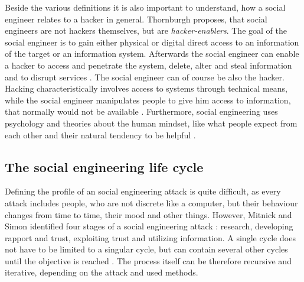 Beside the various definitions it is also important to understand, how a social
engineer relates to a hacker in general. Thornburgh \cite{thornburgh2004}
proposes, that social engineers are not hackers themselves, but are
\textit{hacker-enablers}.  The goal of the social engineer is to gain either
physical or digital direct access to an information of the target or an
information system. Afterwards the social engineer can enable a hacker to
access and penetrate the system, delete, alter and steal information and to
disrupt services \cite{thornburgh2004}. The social engineer can of course be
also the hacker.  Hacking characteristically involves access to systems through
technical means, while the social engineer manipulates people to give him
access to information, that normally would not be available \cite{jones2004}.
Furthermore, social engineering uses psychology and theories about the human
mindset, like what people expect from each other and their natural tendency to
be helpful \cite{jones2004}.


\subsection{The social engineering life cycle}

Defining the profile of an social engineering attack is quite difficult, as
every attack includes people, who are not discrete like a computer, but their
behaviour changes from time to time, their mood and other things. However,
Mitnick and Simon identified four stages of a social engineering attack
\cite{mitnick2003}: research, developing rapport and trust, exploiting trust
and utilizing information. A single cycle does not have to be limited to a
singular cycle, but can contain several other cycles until the objective is
reached \cite{thornburgh2004}. The process itself can be therefore recursive
and iterative, depending on the attack and used methods.

